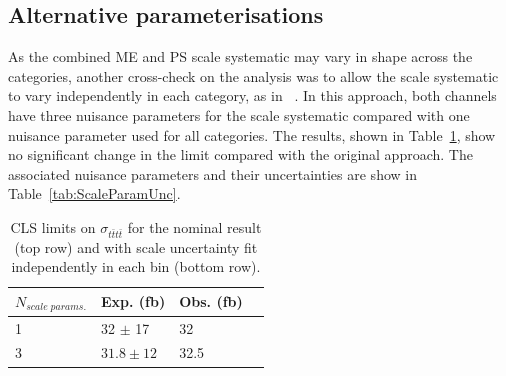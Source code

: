 


\subsection{Alternative parameterisations}

As the combined ME and PS scale systematic may vary in shape across the \njets categories, another cross-check on the analysis was to allow the scale systematic to vary independently in each \njets category, as in ~\cite{ref:heavyquarksSplit, ref:B2G-12-004}. In this approach, both channels have three nuisance parameters for the scale systematic compared with one nuisance parameter used for all \njets categories. The results, shown in Table~\ref{tab:limsScale}, show no significant change in the limit compared with the original approach. The associated nuisance parameters and their uncertainties are show in Table~\ref{tab:ScaleParamUnc}.

\begin{table}[ht!]
\centering
\begin{tabular}{| l | l | l | p{1cm} |}
 \hline 
$N_{scale \; params.}$ & Exp. (fb) &Obs. (fb) \\
\hline
1&{\color{blue} 32  $\pm$ 17}  & {\color{blue}32}\\
 \hline
3  &  $31.8\pm{12}$ & 32.5 \\
\hline
\end{tabular}
\caption{CLS limits on $\sigma_{t\bar{t}t\bar{t}}$ for the nominal result (top row) and with scale uncertainty fit independently in each \njets bin (bottom row). }
\label{tab:limsScale}
\end{table}

